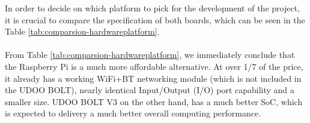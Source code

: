 In order to decide on which platform to pick for the development of the project, it is crucial to compare the specification of both boards, which can be seen in the Table \ref{tab:comparsion-hardwareplatform}.

\paragraph{} From Table \ref{tab:comparsion-hardwareplatform}, we immediately conclude that the Raspberry Pi is a much more affordable alternative. At over 1/7 of the price, it already has a working WiFi+BT networking module (which is not included in the UDOO BOLT), nearly identical Input/Output (I/O) port capability and a smaller size. UDOO BOLT V3 on the other hand, has a much better SoC, which is expected to delivery a much better overall computing performance.

